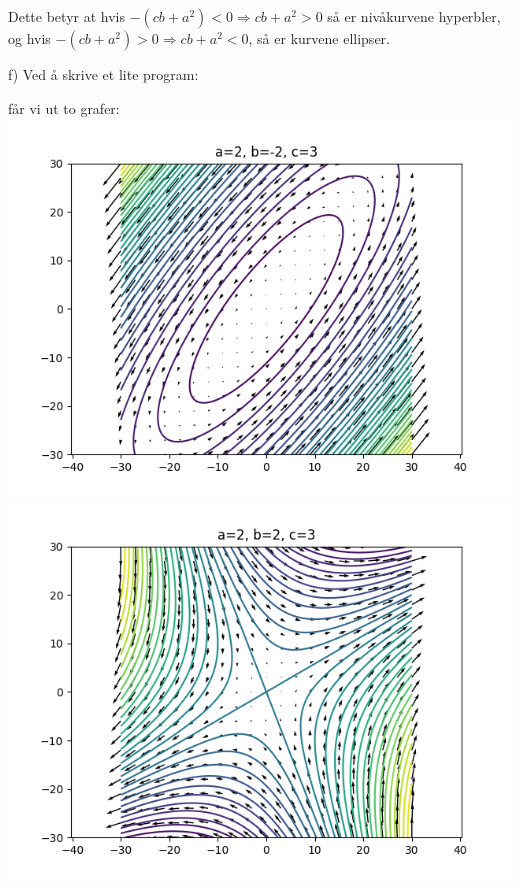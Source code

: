 \documentclass[12pt, a4paper]{article}
\begin{document}
Dette betyr at hvis $-(cb + a^2) < 0 \Rightarrow cb + a^2 > 0$ så er nivåkurvene hyperbler, og hvis $-(cb + a^2) > 0 \Rightarrow cb + a^2 < 0$, så er kurvene ellipser.

\newpage

f) Ved å skrive et lite program:


får vi ut to grafer: \\
\includegraphics[scale=0.5]{ellipse}
\includegraphics[scale=0.5]{hyperbolic}



    
\end{document}
